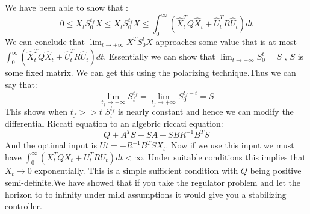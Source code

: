 \documentclass{article}
\begin{document}
We have been able to show that :
\begin{equation}
    0 \leq X_tS_0^{t_f}X \leq X_tS_0^{t_f}X \leq \int_{0}^{\infty}(\hat X_t^{T}Q\hat X_t + \hat U_t^{T}R\hat U_t)dt
\end{equation}
We can conclude that $\lim_{t \to +\infty} X^{T}S_0^{t}X$ approaches some value that is at most $\int_{0}^{\infty}(\hat X_t^{T}Q\hat X_t + \hat U_t^{T}R\hat U_t)dt$. Essentially we can show that $\lim_{t \to +\infty} S_0^{t} = S$ , $S$ is some fixed matrix. We can get this using the polarizing technique.Thus we can say that:
\begin{equation}
    \lim_{t_f \to +\infty} S_t^{t_f} = \lim_{t_f \to +\infty} S_0^{t_f-t} =S
\end{equation}
This shows when $t_f>>t$ $S_t^{t_f}$ is nearly constant and hence we can modify the differential Riccati equation to an algebric riccati equation:
\begin{equation}
    Q + A^{T}S + SA - SBR^{-1}B^{T}S
\end{equation}
And the optimal input is $U{t} = -R^{-1}B^{T}SX_t$. Now if we use this input we must have $\int_{0}^{\infty}(X_t^{T}QX_t + U_t^{T}RU_t)dt < \infty$. Under suitable conditions this implies that $X_t \to 0$ exponentially. This is a simple sufficient condition with $Q$ being positive semi-definite.We have showed that if you take the regulator problem and let the horizon to to infinity under mild assumptions it would give you a stabilizing controller.



\end{document}
